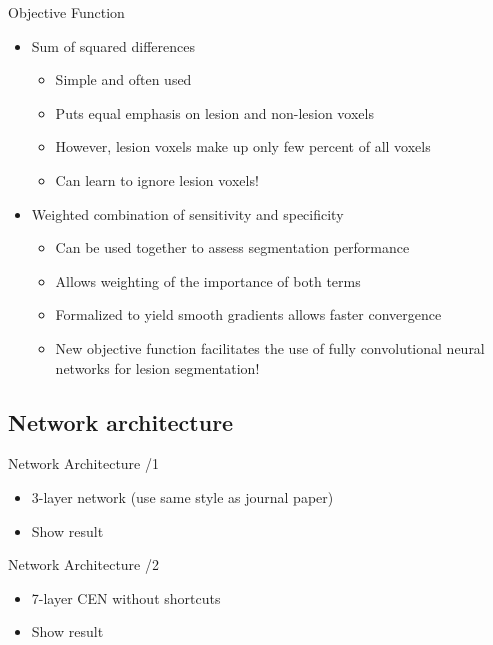\documentclass{beamer}
\begin{document}
\begin{frame}{Objective Function}
\begin{itemize}
\item Sum of squared differences
\begin{itemize}
\item Simple and often used
\item Puts equal emphasis on lesion and non-lesion voxels
\item However, lesion voxels make up only few percent of all voxels
\item<2->[$\Rightarrow$] \alert{Can learn to ignore lesion voxels!} 
\end{itemize}
\item<3-> Weighted combination of sensitivity and specificity
\begin{itemize}
\item Can be used together to assess segmentation performance
\item Allows weighting of the importance of both terms
\item Formalized to yield smooth gradients allows faster convergence
\item<4->[$\Rightarrow$] \alert{New objective function facilitates the use of
fully convolutional neural networks for lesion segmentation!}
\end{itemize}
\end{itemize}
\end{frame}

\subsection{Network architecture}

\begin{frame}{Network Architecture /1}
\begin{itemize}
\item 3-layer network (use same style as journal paper)
\item Show result
\end{itemize}
\end{frame}

\begin{frame}{Network Architecture /2}
\begin{itemize}
\item 7-layer CEN without shortcuts
\item Show result
\end{itemize}
\end{frame}
\end{document}
